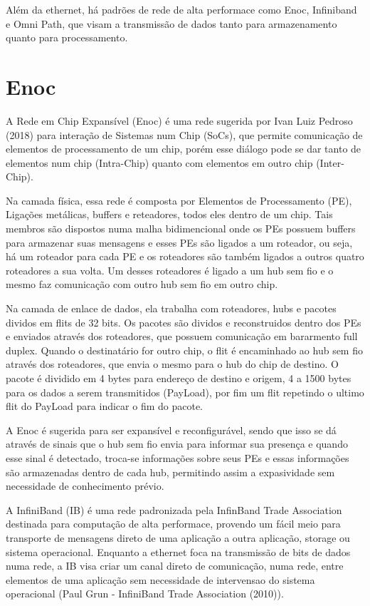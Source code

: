 \documentclass[a4paper,12pt]{article}
\begin{document}
Além da ethernet, há padrões de rede de alta performace como Enoc, Infiniband e Omni Path, que visam a transmissão de dados tanto para armazenamento quanto para processamento.

\section{Enoc}
A Rede em Chip Expansível (Enoc) é uma rede sugerida por Ivan Luiz Pedroso (2018) para interação de Sistemas num Chip (SoCs), que permite comunicação de elementos de processamento de um chip, porém esse diálogo pode se dar tanto de elementos num chip (Intra-Chip) quanto com elementos em outro chip (Inter-Chip).

Na camada física, essa rede é composta por Elementos de Processamento (PE), Ligações metálicas, buffers e reteadores, todos eles dentro de um chip. Tais membros são dispostos numa malha bidimencional onde os PEs possuem buffers para armazenar suas mensagens e esses PEs são ligados a um roteador, ou seja, há um roteador para cada PE e os roteadores são também ligados a outros quatro roteadores a sua volta. Um desses roteadores é ligado a um hub sem fio e o mesmo faz comunicação com outro hub sem fio em outro chip.

Na camada de enlace de dados, ela trabalha com roteadores, hubs e pacotes dividos em flits de 32 bits. Os pacotes são dividos e reconstruidos dentro dos PEs e enviados através dos roteadores, que possuem comunicação em bararmento full duplex. Quando o destinatário for outro chip, o flit é encaminhado ao hub sem fio através dos roteadores, que envia o mesmo para o hub do chip de destino. O pacote é dividido em 4 bytes para endereço de destino e origem, 4 a 1500 bytes para os dados a serem transmitidos (PayLoad), por fim um flit repetindo o ultimo flit do PayLoad para indicar o fim do pacote.

A Enoc é sugerida para ser expansível e reconfigurável, sendo que isso se dá através de sinais que o hub sem fio envia para informar sua presença e quando esse sinal é detectado, troca-se informações sobre seus PEs e essas informações são armazenadas dentro de cada hub, permitindo assim a expasividade sem necessidade de conhecimento prévio.

A InfiniBand (IB) é uma rede padronizada pela InfinBand Trade Association destinada para computação de alta performace, provendo um fácil meio para transporte de mensagens direto de uma aplicação a outra aplicação, storage ou sistema operacional. Enquanto a ethernet foca na transmissão de bits de dados numa rede, a IB visa criar um canal direto de comunicação, numa rede, entre elementos de uma aplicação sem necessidade de intervensao do sistema operacional (Paul Grun - InfiniBand Trade Association (2010)).
\end{document}
